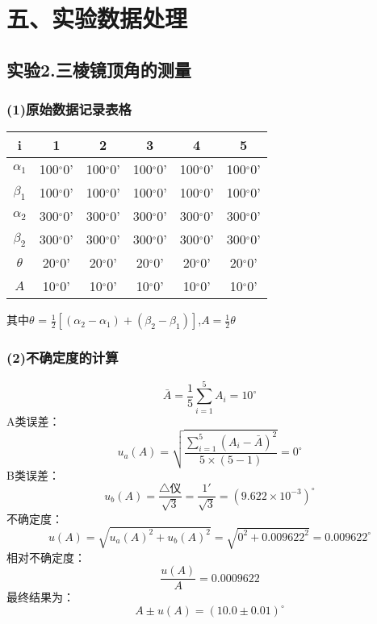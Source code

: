 \documentclass[11pt,a4paper,oneside]{article}
\begin{document}
\section*{五、实验数据处理}
\subsection*{实验2.三棱镜顶角的测量}
\subsubsection*{(1)原始数据记录表格}

\begin{center}

\begin{tabular}{|c|c|c|c|c|c|}
\hline
i & 1 & 2 & 3 & 4 & 5 \\
\hline
${\alpha}_1$
&100$^{\circ}$0'&100$^{\circ}$0'&100$^{\circ}$0'&100$^{\circ}$0'&100$^{\circ}$0'
\\
\hline
${\beta}_1$
&100$^{\circ}$0'&100$^{\circ}$0'&100$^{\circ}$0'&100$^{\circ}$0'&100$^{\circ}$0'
\\
\hline
${\alpha}_2$
&300$^{\circ}$0'&300$^{\circ}$0'&300$^{\circ}$0'&300$^{\circ}$0'&300$^{\circ}$0'
\\
\hline
${\beta}_2$
&300$^{\circ}$0'&300$^{\circ}$0'&300$^{\circ}$0'&300$^{\circ}$0'&300$^{\circ}$0'
\\
\hline
${\theta}$
&20$^{\circ}$0'&20$^{\circ}$0'&20$^{\circ}$0'&20$^{\circ}$0'&20$^{\circ}$0'
\\
\hline
$A$
&10$^{\circ}$0'&10$^{\circ}$0'&10$^{\circ}$0'&10$^{\circ}$0'&10$^{\circ}$0'
\\
\hline
\end{tabular}
\vspace{10pt}

其中$\theta$ = $\displaystyle\frac{1}{2}[({\alpha}_2-{\alpha_1})+({\beta}_2-{\beta}_1)]$,$A=\displaystyle\frac{1}{2}{\theta}$

\end{center}

\subsubsection*{(2)不确定度的计算}

$$\bar{A} =\frac{1}{5}\sum\limits_{i=1}^{5}{A_i}=10 ^{\circ} $$
A类误差：$$u_a({A})=\sqrt{\displaystyle\frac{\sum\limits_{i=1}^{5} ({A}_i-\bar{A})^2}{5{\times}(5-1)}}=0 ^{\circ}$$
B类误差：$$u_b({A})=\displaystyle\frac{\bigtriangleup\text{仪}}{\sqrt{3}}
= \frac{1'}{\sqrt{3}} = (9.622 \times 10^{-3})^{\circ} $$
不确定度：$$u({A})=\sqrt{{u_a({A})}^2+{u_b({A})}^2}=\sqrt{ 0^2 + 0.009622^2} = 0.009622 ^{\circ}$$
相对不确定度：$$\displaystyle\frac{u(A)}{A}=0.0009622$$
最终结果为：$$A{\pm}u(A) = (10.0 {\pm} 0.01) ^{\circ}$$
\end{document}
